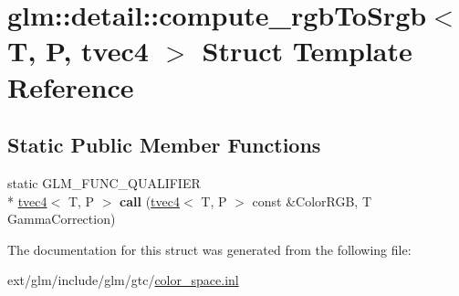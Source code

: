\hypertarget{structglm_1_1detail_1_1compute__rgb_to_srgb_3_01_t_00_01_p_00_01tvec4_01_4}{\section{glm\-:\-:detail\-:\-:compute\-\_\-rgb\-To\-Srgb$<$ T, P, tvec4 $>$ Struct Template Reference}
\label{structglm_1_1detail_1_1compute__rgb_to_srgb_3_01_t_00_01_p_00_01tvec4_01_4}
}
\subsection*{Static Public Member Functions}
\begin{DoxyCompactItemize}
\item 
\hypertarget{structglm_1_1detail_1_1compute__rgb_to_srgb_3_01_t_00_01_p_00_01tvec4_01_4_ae56f0243296dfc80da17770e0cab5edf}{static G\-L\-M\-\_\-\-F\-U\-N\-C\-\_\-\-Q\-U\-A\-L\-I\-F\-I\-E\-R \\*
\hyperlink{structglm_1_1tvec4}{tvec4}$<$ T, P $>$ {\bfseries call} (\hyperlink{structglm_1_1tvec4}{tvec4}$<$ T, P $>$ const \&Color\-R\-G\-B, T Gamma\-Correction)}\label{structglm_1_1detail_1_1compute__rgb_to_srgb_3_01_t_00_01_p_00_01tvec4_01_4_ae56f0243296dfc80da17770e0cab5edf}

\end{DoxyCompactItemize}


The documentation for this struct was generated from the following file\-:\begin{DoxyCompactItemize}
\item 
ext/glm/include/glm/gtc/\hyperlink{gtc_2color__space_8inl}{color\-\_\-space.\-inl}\end{DoxyCompactItemize}
